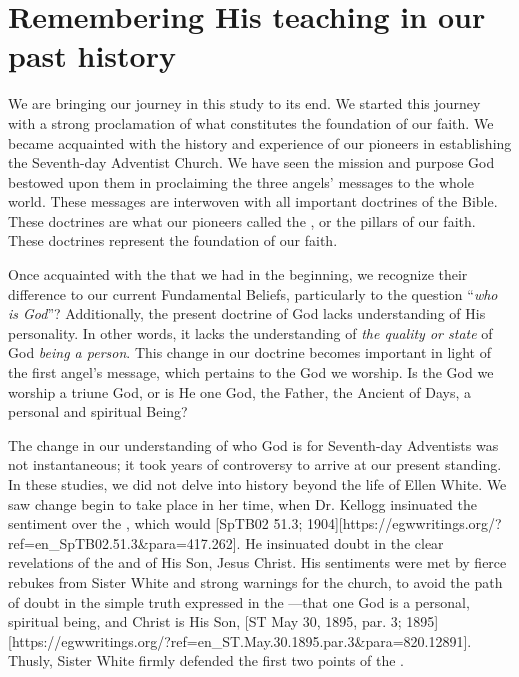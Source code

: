 \chapter{Remembering His teaching in our past history}

We are bringing our journey in this study to its end. We started this journey with a strong proclamation of what constitutes the foundation of our faith. We became acquainted with the history and experience of our pioneers in establishing the Seventh-day Adventist Church. We have seen the mission and purpose God bestowed upon them in proclaiming the three angels’ messages to the whole world. These messages are interwoven with all important doctrines of the Bible. These doctrines are what our pioneers called the , or the pillars of our faith. These doctrines represent the foundation of our faith.

Once acquainted with the  that we had in the beginning, we recognize their difference to our current Fundamental Beliefs, particularly to the question “\textit{who is God}”? Additionally, the present doctrine of God lacks understanding of His personality. In other words, it lacks the understanding of \textit{the quality or state} of God \textit{being a person}. This change in our doctrine becomes important in light of the first angel’s message, which pertains to the God we worship. Is the God we worship a triune God, or is He one God, the Father, the Ancient of Days, a personal and spiritual Being?

The change in our understanding of who God is for Seventh-day Adventists was not instantaneous; it took years of controversy to arrive at our present standing. In these studies, we did not delve into history beyond the life of Ellen White. We saw change begin to take place in her time, when Dr. Kellogg insinuated the sentiment over the , which would [SpTB02 51.3; 1904][https://egwwritings.org/?ref=en\_SpTB02.51.3&para=417.262]. He insinuated doubt in the clear revelations of the  and of His Son, Jesus Christ. His sentiments were met by fierce rebukes from Sister White and strong warnings for the church, to avoid the path of doubt in the simple truth expressed in the —that one God is a personal, spiritual being, and Christ is His Son, [ST May 30, 1895, par. 3; 1895][https://egwwritings.org/?ref=en\_ST.May.30.1895.par.3&para=820.12891]. Thusly, Sister White firmly defended the first two points of the .

